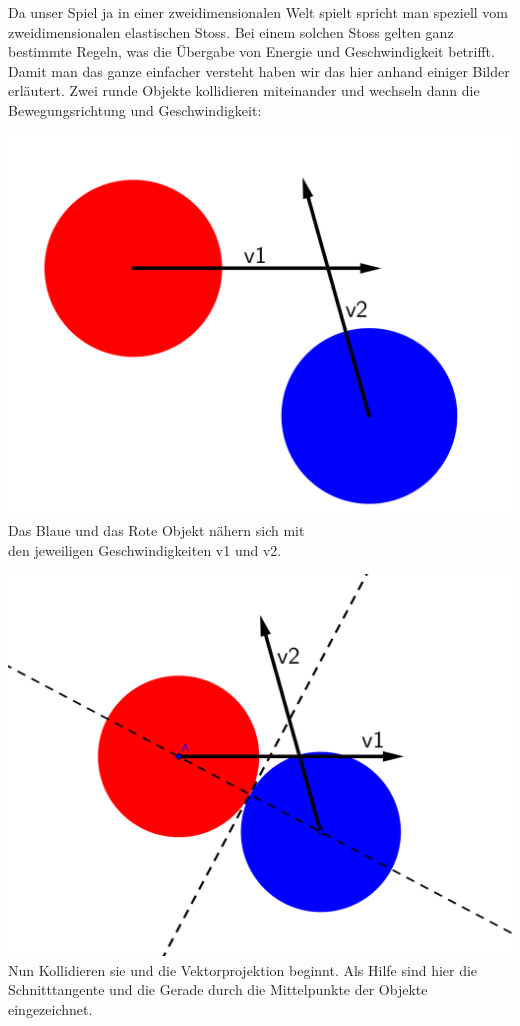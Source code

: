 \documentclass[12pt,a4paper]{scrartcl}
\begin{document}
Da unser Spiel ja in einer zweidimensionalen Welt spielt spricht man speziell vom zweidimensionalen elastischen Stoss.
Bei einem solchen Stoss gelten ganz bestimmte Regeln, was die Übergabe von Energie und Geschwindigkeit betrifft.
Damit man das ganze einfacher versteht haben wir das hier anhand einiger Bilder erläutert.
Zwei runde Objekte kollidieren miteinander und wechseln dann die Bewegungsrichtung und Geschwindigkeit:



\begin{center}
\includegraphics[scale=0.8]{img/Elastischer_stoss_1.png} \\
Das Blaue und das Rote Objekt nähern sich mit \\den jeweiligen Geschwindigkeiten v1 und v2.
\end{center}

\begin{center}
\includegraphics[scale=0.8]{img/Elastischer_stoss_2.png} \\
Nun Kollidieren sie und die Vektorprojektion beginnt. Als Hilfe sind hier die Schnitttangente und die Gerade durch die Mittelpunkte der Objekte eingezeichnet.
\end{center}
\end{document}
